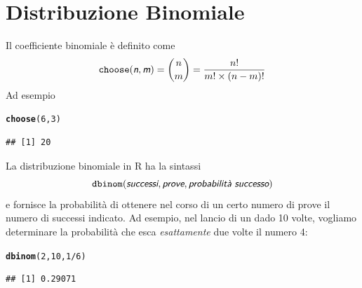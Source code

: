 \documentclass[onecolumn,12pt]{book}\usepackage[]{graphicx}\usepackage[]{color}
\makeatletter
\newcommand{\hlnum}[1]{\textcolor[rgb]{0.686,0.059,0.569}{#1}}%
\newcommand{\hlopt}[1]{\textcolor[rgb]{0,0,0}{#1}}%
\newcommand{\hlstd}[1]{\textcolor[rgb]{0.345,0.345,0.345}{#1}}%
\newcommand{\hlkwd}[1]{\textcolor[rgb]{0.737,0.353,0.396}{\textbf{#1}}}%
\newenvironment{kframe}{%
 \def\at@end@of@kframe{}%
 \ifinner\ifhmode%
  \def\at@end@of@kframe{\end{minipage}}%
  \begin{minipage}{\columnwidth}%
 \fi\fi%
 \def\FrameCommand##1{\hskip\@totalleftmargin \hskip-\fboxsep
 \colorbox{shadecolor}{##1}\hskip-\fboxsep
     \hskip-\linewidth \hskip-\@totalleftmargin \hskip\columnwidth}%
 \MakeFramed {\advance\hsize-\width
   \@totalleftmargin\z@ \linewidth\hsize
   \@setminipage}}%
 {\par\unskip\endMakeFramed%
 \at@end@of@kframe}
\newenvironment{knitrout}{}{} %
\newcommand{\varia}[1]{\textsl{\textsf{#1}}}
\makeatother
\begin{document}
\section{Distribuzione Binomiale}
Il coefficiente binomiale \`e definito come
\begin{equation*} \texttt{choose}(\varia{n},\varia{m})={n \choose m}=\dfrac{n!}{m!\times (n-m)!}\end{equation*}
Ad esempio
\begin{knitrout}
\color{fgcolor}\begin{kframe}
\begin{alltt}
\hlkwd{choose}\hlstd{(}\hlnum{6}\hlstd{,}\hlnum{3}\hlstd{)}
\end{alltt}
\begin{verbatim}
## [1] 20
\end{verbatim}
\end{kframe}
\end{knitrout}
La distribuzione binomiale in \textsf{R} ha la sintassi $$\texttt{dbinom}(\varia{successi},\varia{prove},
\varia{probabilit\`a successo})$$ e fornisce la  probabilit\`a di ottenere nel corso di un certo numero di prove  il numero di successi indicato.
Ad esempio, nel lancio di un dado 10 volte, vogliamo determinare la  probabilit\`a che esca  \emph{esattamente} due volte il numero 4:
\begin{knitrout}
\color{fgcolor}\begin{kframe}
\begin{alltt}
\hlkwd{dbinom}\hlstd{(}\hlnum{2}\hlstd{,}\hlnum{10}\hlstd{,}\hlnum{1}\hlopt{/}\hlnum{6}\hlstd{)}
\end{alltt}
\begin{verbatim}
## [1] 0.29071
\end{verbatim}
\end{kframe}
\end{knitrout}
\end{document}
